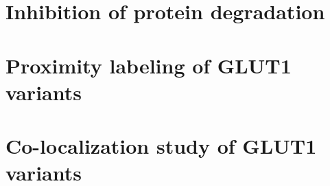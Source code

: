 \section{Inhibition of protein degradation}


\section{Proximity labeling of GLUT1 variants}

\section{Co-localization study of GLUT1 variants}

